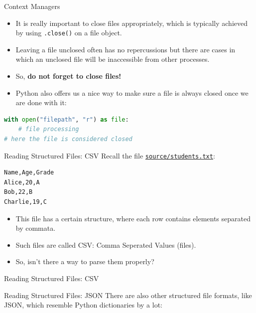 \documentclass[aspectratio=169, 12pt, xcolor=table]{beamer}
\newcommand{\ohref}[1]{\href{#1}{\texttt{#1}}}
\begin{document}
	\begin{frame}[fragile]{Context Managers}
		\begin{itemize}
			\item It is really important to close files appropriately, which is typically achieved by using \texttt{.close()} on a file object.
			\item Leaving a file unclosed often has no repercussions but there are cases in which an unclosed file will be inaccessible from other processes.
			\item So, \textbf{do not forget to close files!}
			\item Python also offers us a nice way to make sure a file is always closed once we are done with it:
		\end{itemize}
		\begin{lstlisting}[language=Python]
with open("filepath", "r") as file:
    # file processing
# here the file is considered closed
\end{lstlisting}
	\end{frame}

	\begin{frame}[fragile]{Reading Structured Files: CSV}
		Recall the file \ohref{source/students.txt}:
		\begin{lstlisting}
Name,Age,Grade
Alice,20,A
Bob,22,B
Charlie,19,C
\end{lstlisting}
		\begin{itemize}
			\item This file has a certain structure, where each row contains elements separated by commata.
			\item Such files are called CSV: Comma Seperated Values (files).
			\item So, isn't there a way to parse them properly?
		\end{itemize}
	\end{frame}

	\begin{frame}{Reading Structured Files: CSV}
		
	\end{frame}

	\begin{frame}{Reading Structured Files: JSON}
		There are also other structured file formats, like JSON, which resemble Python dictionaries by a lot:
		
	\end{frame}
\end{document}
